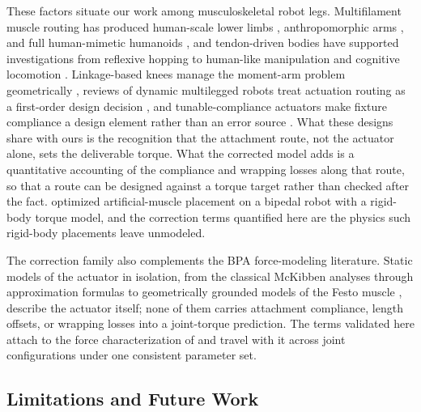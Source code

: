 These factors situate our work among musculoskeletal robot legs. Multifilament muscle routing has produced human-scale lower limbs \citep{kurumaya_musculoskeletal_2016}, anthropomorphic arms \citep{hitzmann_anthropomorphic_2018}, and full human-mimetic humanoids \citep{asano_musculoskeletal_2019}, and tendon-driven bodies have supported investigations from reflexive hopping \citep{liu_robotic_2018} to human-like manipulation \citep{chen_realizing_2019} and cognitive locomotion \citep{schilling_adaptive_2022}. Linkage-based knees manage the moment-arm problem geometrically \citep{romero_four-bar_2020}, reviews of dynamic multilegged robots treat actuation routing as a first-order design decision \citep{he_mechanism_2020}, and tunable-compliance actuators make fixture compliance a design element rather than an error source \citep{leibach_development_2020}. What these designs share with ours is the recognition that the attachment route, not the actuator alone, sets the deliverable torque. What the corrected model adds is a quantitative accounting of the compliance and wrapping losses along that route, so that a route can be designed against a torque target rather than checked after the fact. \citet{morrow_optimization_2020} optimized artificial-muscle placement on a bipedal robot with a rigid-body torque model, and the correction terms quantified here are the physics such rigid-body placements leave unmodeled.

The correction family also complements the BPA force-modeling literature. Static models of the actuator in isolation, from the classical McKibben analyses \citep{chou_measurement_1996} through approximation formulas \citep{sarosi_new_2012} to geometrically grounded models of the Festo muscle \citep{martens_modeling_2017, tondu_static_2022}, describe the actuator itself; none of them carries attachment compliance, length offsets, or wrapping losses into a joint-torque prediction. The terms validated here attach to the force characterization of \citet{bolen_2026} and travel with it across joint configurations under one consistent parameter set.

\subsection{Limitations and Future Work}\label{sec:limitations}

